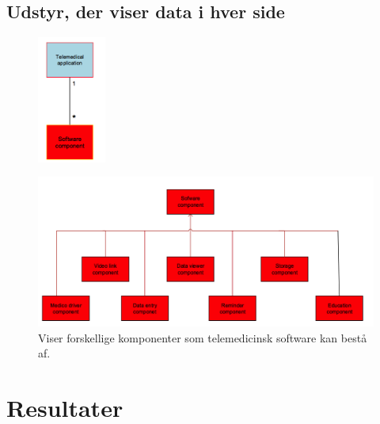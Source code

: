 \subsection{Udstyr, der viser data i hver side}
\begin{figure}[H]
	\centering
	\includegraphics[width=0.2\textwidth]{Figurer/Snip20160504_31}
\end{figure}

\begin{figure}[H]
	\centering
	\includegraphics[width=1\textwidth]{Figurer/Snip20160504_32}
	\caption{Viser forskellige komponenter som telemedicinsk software kan bestå af.}
\end{figure}

\section{Resultater}
